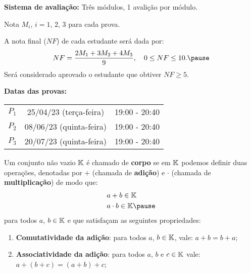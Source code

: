 \documentclass{beamer}
\begin{document}
    \begin{frame}
        {\bf{Sistema de avaliação:}} Três módulos, 1 avalição por módulo.\pause

            Nota $M_i$, $i=1$, 2, 3 para cada prova.\pause

            A nota final ($NF$) de cada estudante ser\'a dada por:\pause
        \[
            NF = \dfrac{2M_1 + 3M_2 + 4M_3}{9}, \quad 0 \le NF \le 10.\pause
        \]
        Ser\'a considerado aprovado o estudante que obtiver $NF \ge 5$.
    \end{frame}

    \begin{frame}
        {\bf Datas das provas:}
        \begin{center}
            \begin{tabular}{c|c|c}
                \hline\hline
                \hspace{0.5cm}{\bf Prova}\hspace{0.5cm} & \hspace{1cm}{\bf Data}\hspace{1cm} & \hspace{1cm}{\bf Hor\'{a}rio}\hspace{1cm} \\
                \hline\hline
                $P_1$ & 25/04/23 (terça-feira) & 19:00 - 20:40 \\
                \hline
                $P_2$ & 08/06/23 (quinta-feira) & 19:00 - 20:40 \\
                \hline
                $P_3$ & 20/07/23 (quinta-feira) & 19:00 - 20:40 \\
                \hline\hline
            \end{tabular}
        \end{center}
    \end{frame}

    \begin{frame}
        \begin{definicao}
	    Um conjunto n\~ao vazio $\mathbb{K}$ \'e chamado de \textbf{corpo} \pause se em $\mathbb{K}$ podemos definir duas opera\c{c}\~oes, denotadas por $+$ (chamada de \textbf{adi\c{c}\~ao}) \pause e $\cdot$ (chamada de \textbf{multiplica\c{c}\~ao}) \pause de modo que:
            \begin{align*}
                a &+ b \in \cp{K}\\
    	        a &\cdot b \in \cp{K}\pause
            \end{align*}
            para todos $a$, $b \in \mathbb{K}$ \pause e que satisfa\c{c}am as seguintes propriedades:\pause
	    \begin{enumerate}[label={\roman*})]
                \item \textbf{Comutatividade da adi\c{c}\~ao}: para todos $a$, $b \in \mathbb{K}$, \pause vale: \pause $a + b = b + a$;\pause
		\item \textbf{Associatividade da adi\c{c}\~ao}: para todos $a$, $b$ e $c \in \mathbb{K}$ vale: \pause $a + (b + c) = (a + b) + c$;
                \seti
            \end{enumerate}
        \end{definicao}
    \end{frame}
\end{document}
